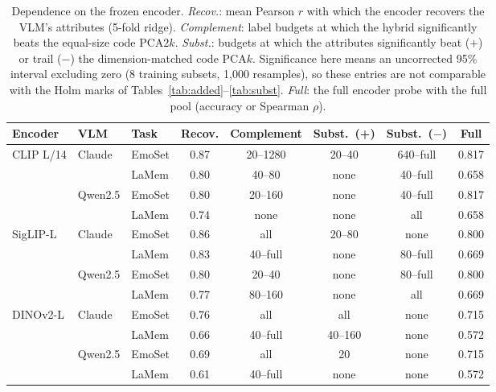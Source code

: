 \begin{table}[t]
\centering
\caption{Dependence on the frozen encoder. \emph{Recov.}: mean Pearson $r$ with which the encoder recovers the VLM's attributes (5-fold ridge). \emph{Complement}: label budgets at which the hybrid significantly beats the equal-size code PCA$2k$. \emph{Subst.}: budgets at which the attributes significantly beat (+) or trail ($-$) the dimension-matched code PCA$k$. Significance here means an uncorrected 95\% interval excluding zero (8 training subsets, 1,000 resamples), so these entries are not comparable with the Holm marks of Tables~\ref{tab:added}--\ref{tab:subst}. \emph{Full}: the full encoder probe with the full pool (accuracy or Spearman $\rho$).}
\label{tab:encoders}
\footnotesize\setlength{\tabcolsep}{3pt}
\begin{tabular}{@{}lllccccc@{}}
\toprule
Encoder & VLM & Task & Recov. & Complement & Subst.~(+) & Subst.~($-$) & Full \\
\midrule
CLIP L/14 & Claude & EmoSet & 0.87 & 20--1280 & 20--40 & 640--full & 0.817 \\
 &  & LaMem & 0.80 & 40--80 & none & 40--full & 0.658 \\
 & Qwen2.5 & EmoSet & 0.80 & 20--160 & none & 40--full & 0.817 \\
 &  & LaMem & 0.74 & none & none & all & 0.658 \\
\midrule
SigLIP-L & Claude & EmoSet & 0.86 & all & 20--80 & none & 0.800 \\
 &  & LaMem & 0.83 & 40--full & none & 80--full & 0.669 \\
 & Qwen2.5 & EmoSet & 0.80 & 20--40 & none & 80--full & 0.800 \\
 &  & LaMem & 0.77 & 80--160 & none & all & 0.669 \\
\midrule
DINOv2-L & Claude & EmoSet & 0.76 & all & all & none & 0.715 \\
 &  & LaMem & 0.66 & 40--full & 40--160 & none & 0.572 \\
 & Qwen2.5 & EmoSet & 0.69 & all & 20 & none & 0.715 \\
 &  & LaMem & 0.61 & 40--full & none & none & 0.572 \\
\bottomrule
\end{tabular}
\end{table}
